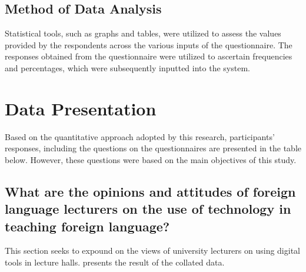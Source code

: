 \documentclass[english]{textolivre}
\begin{document}
\subsection{Method of Data Analysis}

    Statistical tools, such as graphs and tables, were utilized to assess the values provided by the respondents across the various inputs of the questionnaire. The responses obtained from the questionnaire were utilized to ascertain frequencies and percentages, which were subsequently inputted into the system.




\section{Data Presentation}

Based on the quantitative approach adopted by this research, participants’ responses, including the questions on the questionnaires are presented in the table below. However, these questions were based on the main objectives of this study.

\subsection{What are the opinions and attitudes of foreign language lecturers on the use of technology in teaching foreign language?}

This section seeks to expound on the views of university lecturers on using digital tools in lecture halls.  presents the result of the collated data.
\end{document}
